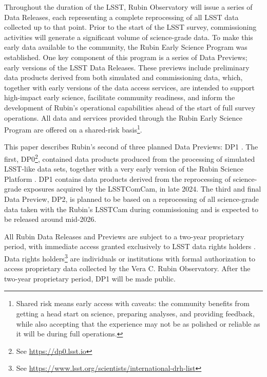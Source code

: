 Throughout the duration of the \gls{LSST},  Rubin Observatory will issue a series of Data Releases, each representing a complete reprocessing of all \gls{LSST} data collected up to that point.
Prior to the start of the \gls{LSST} survey, commissioning activities will generate a significant volume of science-grade data.
To make this early data available to the community, the Rubin Early Science Program \citep{RTN-011} was established.
One key component of this program is a series of Data Previews; early versions of the \gls{LSST} Data Releases.
These previews include preliminary data products derived from both simulated and commissioning data, which, together with early versions of the data access services, are intended to support high-impact early science, facilitate community readiness, and inform the development of Rubin’s operational capabilities ahead of the start of full survey operations.
All data and services provided through the Rubin Early Science Program are offered on a shared-risk basis\footnote{Shared risk means early access with caveats: the community benefits from getting a head start on science, preparing analyses, and providing feedback, while also accepting that the experience may not be as polished or reliable as it will be during full operations.}.

This paper describes Rubin's second of three planned Data Previews: \gls{DP1} \citep{10.71929/rubin/2570308}.
The first, \gls{DP0}\footnote{See \url{https://dp0.lsst.io}}, contained data products produced from the processing of simulated \gls{LSST}-like data sets, together with a very early version of the Rubin \gls{Science Platform} \citep{LSE-319}.
\gls{DP1} contains data products derived from the reprocessing of science-grade exposures acquired by the \gls{LSSTComCam}, in late 2024.
The third and final Data Preview, \gls{DP2}, is planned to be based on a reprocessing of all science-grade data taken with the Rubin's \gls{LSSTCam} during commissioning and is expected to be released around mid-2026.

All Rubin Data Releases and Previews are subject to a two-year proprietary period, with immediate access granted exclusively to LSST data rights holders \citep{rdo-013}.
Data rights holders\footnote{See \url{https://www.lsst.org/scientists/international-drh-list}} are individuals or institutions with formal authorization to access proprietary data collected by the Vera C. Rubin Observatory.
After the two-year proprietary period, \gls{DP1} will be made public.

